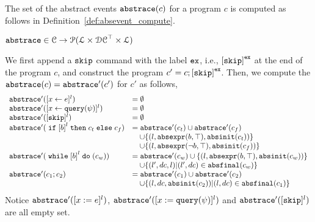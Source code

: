 The set of the abstract events $\mathtt{abs}{\mathtt{trace}}(c)$ for a program $c$
is computed as follows in Definition~\ref{def:absevent_compute}.
 \begin{defn}
 \label{def:absevent_compute}
 $\mathtt{abs}{\mathtt{trace}} \in \mathcal{C} \to \mathcal{P}( \mathcal{L} \times \mathcal{DC}^{\top} \times \mathcal{L} )$
 \end{defn}
 We first append a $\mathtt{skip}$ command with 
the label $\mathtt{ex}$, i.e., $\clabel{\eskip}^{\lex}$ at the end of the program $c$, and construct 
the program $c' = c;\clabel{\eskip}^{\lex}$.
Then, we compute the $\mathtt{abs}{\mathtt{trace}}(c) = \mathtt{abs}{\mathtt{trace}}'(c')$ for $c'$ as follows,
 {
 \[
 \begin{array}{ll}
 \absflow'(\clabel{\assign{x}{\expr}}{}^l) & = \emptyset \\
 \absflow'(\clabel{\assign{x}{\query(\qexpr)}}{}^l) & = \emptyset \\
 \absflow'([\eskip]^{l}) & = \emptyset \\
 \absflow'(\eif \clabel{\bexpr}^{l} \ethen c_t \eelse c_f) & = \absflow'(c_t) \cup \absflow'(c_f)
 \\ & \quad 
 \cup \left\{(l, \absexpr(\bexpr, \top), \absinit(c_t) ) \right\}
 \\ & \quad 
 \cup \left\{ (l, \absexpr(\neg\bexpr, \top), \absinit(c_f)) \right\} \\
 \absflow'(\ewhile \clabel{\bexpr}^{l} \edo (c_w)) & = \absflow'(c_w) \cup \{(l, \absexpr(\bexpr, \top), \absinit(c_w)) \} 
 \\ & \quad 
 \cup \{(l', dc, l)| (l', dc) \in \absfinal(c_w) \} \\
 \absflow'(c_1 ; c_2) & = \absflow'(c_1) \cup \absflow'(c_2) 
 \\ & \quad 
 \cup \{ (l, dc, \absinit(c_2)) | (l, dc) \in \absfinal(c_1) \} \\
 \end{array}
 \]
 }
 Notice $\mathtt{abs}{\mathtt{trace}}'([x := e]^{l})$, $\mathtt{abs}{\mathtt{trace}}'([x := {\tt query}(\psi)]^{l})$ and $\mathtt{abs}{\mathtt{trace}}'([\mathtt{skip}]^{l})$ are all empty set. 
 

